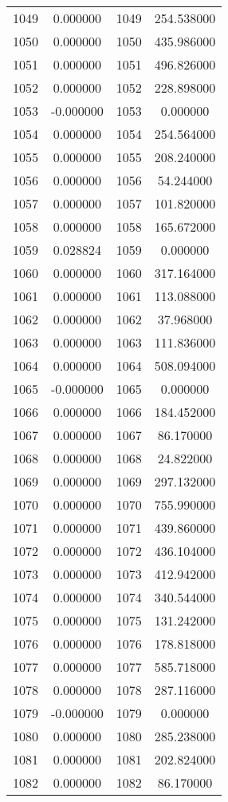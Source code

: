 \documentclass[12pt]{article}
\begin{document}
\begin{longtable}{@{}cccc@{}}
1049 & 0.000000 & 1049 & 254.538000 \\
1050 & 0.000000 & 1050 & 435.986000 \\
1051 & 0.000000 & 1051 & 496.826000 \\
1052 & 0.000000 & 1052 & 228.898000 \\
1053 & -0.000000 & 1053 & 0.000000 \\
1054 & 0.000000 & 1054 & 254.564000 \\
1055 & 0.000000 & 1055 & 208.240000 \\
1056 & 0.000000 & 1056 & 54.244000 \\
1057 & 0.000000 & 1057 & 101.820000 \\
1058 & 0.000000 & 1058 & 165.672000 \\
1059 & 0.028824 & 1059 & 0.000000 \\
1060 & 0.000000 & 1060 & 317.164000 \\
1061 & 0.000000 & 1061 & 113.088000 \\
1062 & 0.000000 & 1062 & 37.968000 \\
1063 & 0.000000 & 1063 & 111.836000 \\
1064 & 0.000000 & 1064 & 508.094000 \\
1065 & -0.000000 & 1065 & 0.000000 \\
1066 & 0.000000 & 1066 & 184.452000 \\
1067 & 0.000000 & 1067 & 86.170000 \\
1068 & 0.000000 & 1068 & 24.822000 \\
1069 & 0.000000 & 1069 & 297.132000 \\
1070 & 0.000000 & 1070 & 755.990000 \\
1071 & 0.000000 & 1071 & 439.860000 \\
1072 & 0.000000 & 1072 & 436.104000 \\
1073 & 0.000000 & 1073 & 412.942000 \\
1074 & 0.000000 & 1074 & 340.544000 \\
1075 & 0.000000 & 1075 & 131.242000 \\
1076 & 0.000000 & 1076 & 178.818000 \\
1077 & 0.000000 & 1077 & 585.718000 \\
1078 & 0.000000 & 1078 & 287.116000 \\
1079 & -0.000000 & 1079 & 0.000000 \\
1080 & 0.000000 & 1080 & 285.238000 \\
1081 & 0.000000 & 1081 & 202.824000 \\
1082 & 0.000000 & 1082 & 86.170000 \\

\end{longtable}
\end{document}
